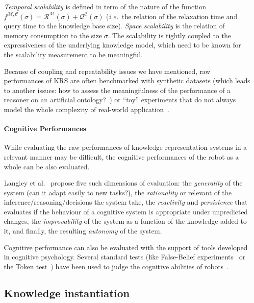 \documentclass[a4paper, twocolumn]{article}
\newcommand{\ie}{{\textit{i.e.\ }}}
\begin{document}
\emph{Temporal scalability} is defined in term of the nature of the function
$f^{\mathcal{M}, \mathcal{C}}(\sigma) = \mathcal{R}^{\mathcal{M}}(\sigma) +
\mathcal{Q}^{\mathcal{C}}(\sigma)$ (\ie the relation of the relaxation time
and query time to the knowledge base size). \emph{Space scalability} is the
relation of memory consumption to the size $\sigma$. The scalability is tightly
coupled to the expressiveness of the underlying knowledge model, which need to
be known for the scalability measurement to be meaningful.

Because of coupling and repeatability issues we have mentioned, raw
performances of KRS are often benchmarked with synthetic datasets (which leads
to another issues: how to assess the meaningfulness of the performance of a
reasoner on an artificial ontology?~\cite{Bail2010}) or ``toy'' experiments
that do not always model the whole complexity of real-world
application~\cite{Chong2009}.

\paragraph{Cognitive Performances} While evaluating the raw performances of
knowledge representation systems in a relevant manner may be difficult, the cognitive
performances of the robot as a whole can be also evaluated.

Langley et al.~\cite{Langley2006} propose five such dimensions of evaluation:
the \emph{generality} of the system (can it adapt easily to new tasks?), the
\emph{rationality} or relevant of the inference/reasoning/decisions the system
take, the \emph{reactivity} and \emph{persistence} that evaluates if the
behaviour of a cognitive system is appropriate under unpredicted changes, the
\emph{improvability} of the system as a function of the knowledge added to it,
and finally, the resulting \emph{autonomy} of the system.

Cognitive performance can also be evaluated with the support of tools developed
in cognitive psychology. Several standard tests (like False-Belief
experiments~\cite{Leslie2000} or the Token test~\cite{DiSimoni1978}) have been
used to judge the cognitive abilities of robots~\cite{Mavridis2006,
Breazeal2006}.
\subsection{Knowledge instantiation}

\begin{scriptsize}
\begin{center}
\end{center}
\end{scriptsize}
\end{document}
